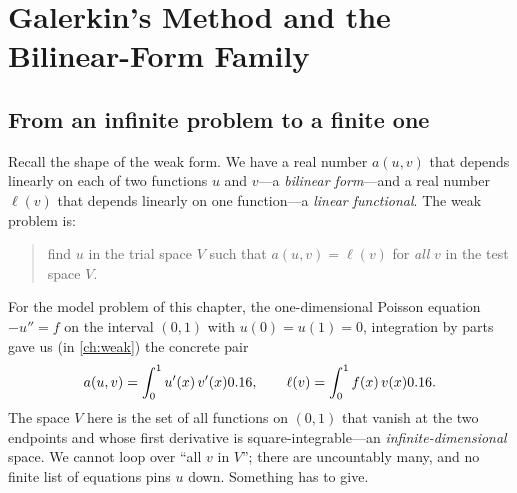 \chapter{Galerkin's Method and the Bilinear-Form Family}
\label{ch:galerkin}


\section{From an infinite problem to a finite one}

Recall the shape of the weak form. We have a real number $a(u,v)$ that depends
linearly on each of two functions $u$ and $v$---a \emph{bilinear form}---and a
real number $\ell(v)$ that depends linearly on one function---a \emph{linear
functional}. The weak problem is:

\begin{quote}
find $u$ in the trial space $V$ such that $a(u,v)=\ell(v)$ for \emph{all} $v$ in
the test space $V$.
\end{quote}

For the model problem of this chapter, the one-dimensional Poisson equation
$-u''=f$ on the interval $(0,1)$ with $u(0)=u(1)=0$, integration by parts gave us
(in \cref{ch:weak}) the concrete pair
\begin{equation}
a(u,v)=\int_0^1 u'(x)\,v'(x)0.16,
\qquad
\ell(v)=\int_0^1 f(x)\,v(x)0.16.
\label{eq:poisson-weak}
\end{equation}
The space $V$ here is the set of all functions on $(0,1)$ that vanish at the two
endpoints and whose first derivative is square-integrable---an
\emph{infinite-dimensional} space. We cannot loop over ``all $v$ in $V$''; there
are uncountably many, and no finite list of equations pins $u$ down. Something
has to give.

